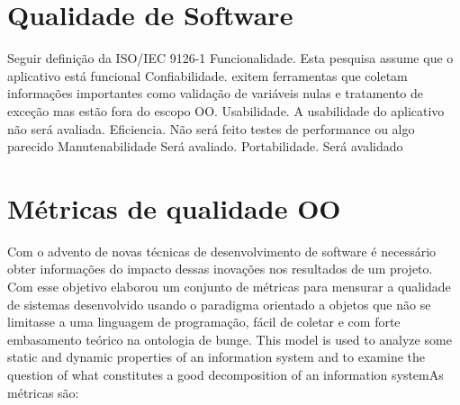 

\section{Qualidade de Software}

Seguir definição da ISO/IEC 9126-1
Funcionalidade. Esta pesquisa assume que o aplicativo está funcional
Confiabilidade. exitem ferramentas que coletam informações importantes como
validação de variáveis nulas e tratamento de exceção mas estão fora do escopo
OO.
Usabilidade. A usabilidade do aplicativo não será
avaliada.
Eficiencia. Não será feito testes de performance ou algo parecido
Manutenabilidade Será avaliado.
Portabilidade. Será avalidado
\section{Métricas de qualidade OO}

Com o advento de novas técnicas de desenvolvimento de software é necessário
obter informações do impacto dessas inovações nos resultados de um projeto. Com
esse objetivo  elaborou um conjunto de métricas para mensurar a
qualidade de sistemas desenvolvido usando o paradigma orientado a objetos que
não se limitasse a uma linguagem de programação, fácil de coletar e com forte
embasamento teórico na ontologia de bunge. This model is used to analyze
some static and dynamic properties of an information system and to examine the
question of what constitutes a good decomposition of an information
system\cite{WandWeber}As métricas são:




